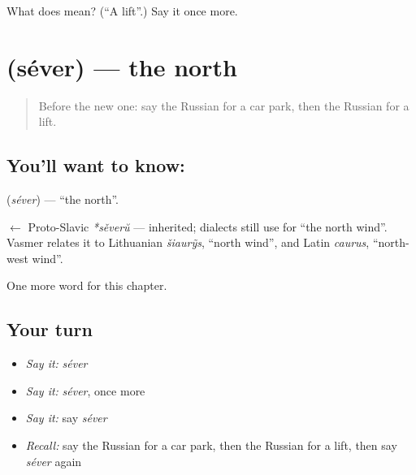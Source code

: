 \begin{tcolorbox}[breakable,colback=teal!4,colframe=teal!35!black,title={Before you move on}]
What does  mean? (\textquotedblleft{}A lift\textquotedblright{}.) Say it once more.
\end{tcolorbox}
\section[\texorpdfstring{\ru{север} (séver)}{север (séver)}]{ (séver) — the north}

\label{lesson:RU-C90-north}



\begin{quote}
Before the new one: say the Russian for a car park, then the Russian for a lift.
\end{quote}

\subsection*{You'll want to know: }
\textbf{} (\emph{séver}) — \textquotedblleft{}the north\textquotedblright{}.

\begin{cousinweb}
\textbf{} $\leftarrow$ Proto-Slavic \emph{*sěverŭ} — inherited; dialects still use \emph{} for \textquotedblleft{}the north wind\textquotedblright{}. Vasmer relates it to Lithuanian \emph{šiaurỹs}, \textquotedblleft{}north wind\textquotedblright{}, and Latin \emph{caurus}, \textquotedblleft{}north-west wind\textquotedblright{}.
\end{cousinweb}

\begin{grammarlens}[title={What you've built}]
One more word for this chapter.
\end{grammarlens}

\subsection*{Your turn}
\begin{itemize}
\raggedright
  \item \emph{Say it:} \emph{séver}
  \item \emph{Say it:} \emph{séver}, once more
  \item \emph{Say it:} say \emph{séver}
  \item \emph{Recall:} say the Russian for a car park, then the Russian for a lift, then say \emph{séver} again
\end{itemize}

